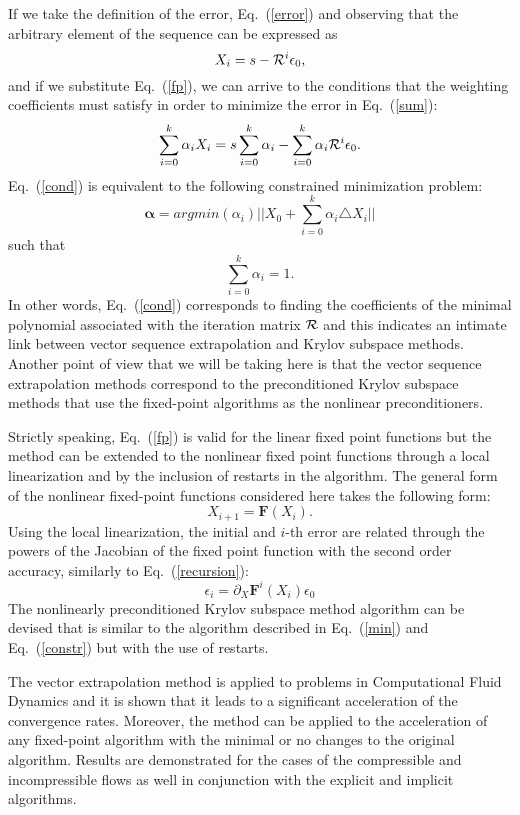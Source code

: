 \documentclass{report}
\begin{document}
If we take the definition of the error, Eq.~(\ref{error}) and
observing that the arbitrary element of the sequence can be
expressed as
\begin{equation}
X_i = s - {\cal R}^i \epsilon_0,
\end{equation}
and if we substitute Eq.~(\ref{fp}), we can arrive to the
conditions that the weighting coefficients must satisfy in order
to minimize the error in Eq.~(\ref{sum}):
\begin{equation}\label{cond}
\sum_{i=0}^{k} \alpha_i X_i = s \sum_{i = 0}^k \alpha_i -
\sum_{i=0}^{k} \alpha_i {\cal R}^i \epsilon_0.
\end{equation}
Eq.~(\ref{cond}) is equivalent to the following constrained
minimization problem:
\begin{equation}\label{min}
\mathbf{\alpha} = argmin(\alpha_i)
|| X_0 + \sum_{i=0}^k \alpha_i \triangle X_i ||
\end{equation}
such that
\begin{equation}\label{constr}
\sum_{i = 0}^k \alpha_i = 1.
\end{equation}
In other words, Eq.~(\ref{cond}) corresponds to finding the
coefficients of the minimal polynomial associated with the
iteration matrix ${\cal R}$ and this indicates an intimate link
between vector sequence extrapolation and Krylov subspace
methods. Another point of view that we will be taking here is
that the vector sequence extrapolation methods correspond to the
preconditioned Krylov subspace methods that use the fixed-point
algorithms as the nonlinear preconditioners.

Strictly speaking, Eq.~(\ref{fp}) is valid for the linear fixed
point functions but the method can be extended to the nonlinear
fixed point functions through a local linearization and by the
inclusion of restarts in the algorithm. The general form of
the nonlinear fixed-point functions considered here takes the
following form:
\begin{equation}
X_{i+1} = \mathbf{F}\left(X_i\right).
\end{equation}
Using the local linearization, the initial and $i$-th error are
related through the powers of the Jacobian of the fixed point
function with the second order accuracy, similarly to
Eq.~(\ref{recursion}):
\begin{equation}
\epsilon_i = \partial_X \mathbf{F}^i\left(X_i\right) \epsilon_0
\end{equation}
The nonlinearly preconditioned Krylov subspace method algorithm
can be devised that is similar to the algorithm described in
Eq.~(\ref{min}) and Eq.~(\ref{constr}) but with the use of
restarts.

The vector extrapolation method is applied to problems in
Computational Fluid Dynamics and it is shown that it leads to a
significant acceleration of the convergence rates. Moreover, the
method can be applied to the acceleration of any fixed-point
algorithm with the minimal or no changes to the original
algorithm. Results are demonstrated for the cases of the
compressible and incompressible flows as well in conjunction with
the explicit and implicit algorithms.
\end{document}
